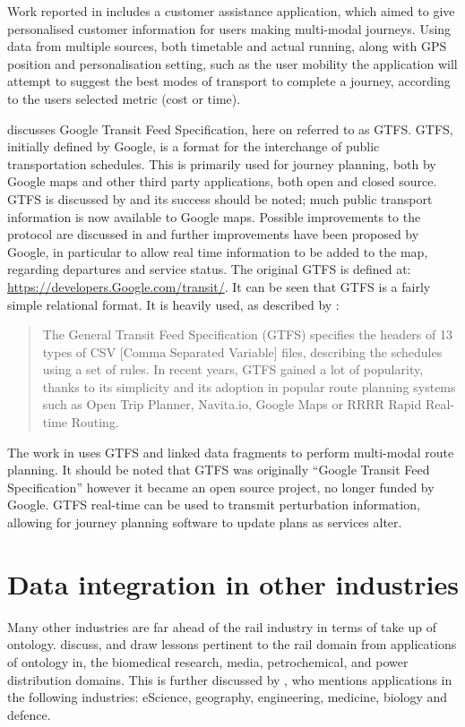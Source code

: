 Work reported in \citet{Verstichel2014} includes a customer assistance application, which aimed to give personalised customer information for users making multi-modal journeys. Using data from multiple sources, both timetable and actual running, along with GPS position and personalisation setting, such as the user mobility the application will attempt to suggest the best modes of transport to complete a journey, according to the users selected metric (cost or time). 

\citet{Morris2016} discusses Google Transit Feed Specification, here on referred to as GTFS. GTFS, initially defined by Google, is a format for the interchange of public transportation schedules. This is primarily used for journey planning, both by Google maps and other third party applications, both open and closed source.  GTFS is discussed by \citet{Santos2014} and its success should be noted; much public transport information is now available to Google maps. Possible improvements to the protocol are discussed in \citet{Santos2014} and further improvements have been proposed by Google, in particular to allow real time information to be added to the map, regarding departures and service status. The original GTFS is defined at: \url{https://developers.Google.com/transit/}. It can be seen that GTFS is a fairly simple relational format. It is heavily used, as described by \citet{Colpaert}:

\begin{quote}
The General Transit Feed Specification (GTFS) specifies the headers of 13 types of CSV [Comma Separated Variable] files, describing the schedules using a set of rules. In recent years, GTFS gained a lot of popularity, thanks to its simplicity and its adoption in popular route planning systems such as Open Trip Planner, Navita.io, Google Maps or RRRR Rapid Real-time Routing.
\end{quote}

The work in \citet{Colpaert} uses GTFS and linked data fragments to perform multi-modal route planning. It should be noted that GTFS was originally ``Google Transit Feed Specification'' however it became an open source project, no longer funded by Google. GTFS real-time can be used to transmit perturbation information, allowing for journey planning software to update plans as services alter. 


\section{Data integration in other industries}
Many other industries are far ahead of the rail industry in terms of take up of ontology. \citet{Morris2014} discuss, and draw lessons pertinent to the rail domain from applications of ontology in, the biomedical research, media, petrochemical, and power distribution domains. This is further discussed by \citet{Horrocks2007}, who mentions applications in the following industries: eScience, geography, engineering, medicine, biology and defence.

